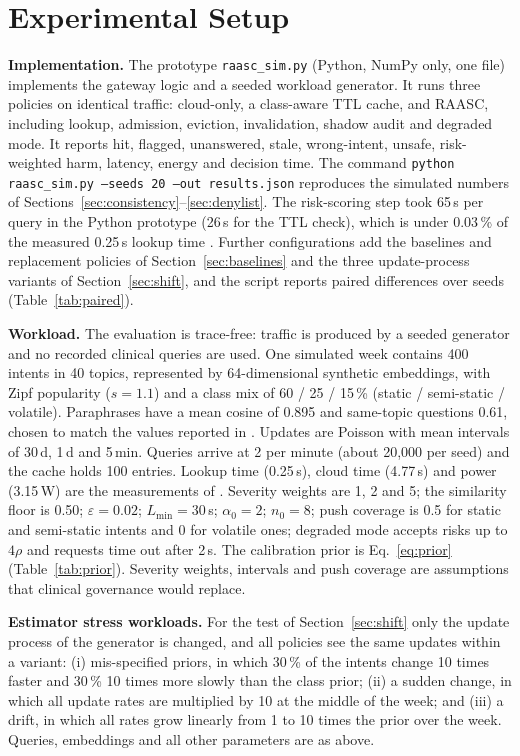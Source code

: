 \documentclass[journal]{IEEEtran}
\newcommand{\pct}{\,\%}
\begin{document}
\section{Experimental Setup}\label{sec:setup}
\textbf{Implementation.} The prototype \texttt{raasc\_sim.py} (Python, NumPy only, one file) implements the gateway logic and a seeded workload generator. It runs three policies on identical traffic: cloud-only, a class-aware TTL cache, and RAASC, including lookup, admission, eviction, invalidation, shadow audit and degraded mode. It reports hit, flagged, unanswered, stale, wrong-intent, unsafe, risk-weighted harm, latency, energy and decision time. The command \texttt{python raasc\_sim.py --seeds 20 --out results.json} reproduces the simulated numbers of Sections~\ref{sec:consistency}--\ref{sec:denylist}. The risk-scoring step took 65\,\textmu s per query in the Python prototype (26\,\textmu s for the TTL check), which is under 0.03\pct{} of the measured 0.25\,s lookup time \cite{montoya2025}. Further configurations add the baselines and replacement policies of Section~\ref{sec:baselines} and the three update-process variants of Section~\ref{sec:shift}, and the script reports paired differences over seeds (Table~\ref{tab:paired}).

\textbf{Workload.} The evaluation is trace-free: traffic is produced by a seeded generator and no recorded clinical queries are used. One simulated week contains 400 intents in 40 topics, represented by 64-dimensional synthetic embeddings, with Zipf popularity ($s=1.1$) and a class mix of 60 / 25 / 15\pct{} (static / semi-static / volatile). Paraphrases have a mean cosine of 0.895 and same-topic questions 0.61, chosen to match the values reported in \cite{montoya2025}. Updates are Poisson with mean intervals of 30\,d, 1\,d and 5\,min. Queries arrive at 2 per minute (about 20,000 per seed) and the cache holds 100 entries. Lookup time (0.25\,s), cloud time (4.77\,s) and power (3.15\,W) are the measurements of \cite{montoya2025}. Severity weights are 1, 2 and 5; the similarity floor is 0.50; $\varepsilon=0.02$; $L_{\min}=30\,$s; $\alpha_0=2$; $n_0=8$; push coverage is 0.5 for static and semi-static intents and 0 for volatile ones; degraded mode accepts risks up to $4\rho$ and requests time out after 2\,s. The calibration prior is Eq.~\eqref{eq:prior} (Table~\ref{tab:prior}). Severity weights, intervals and push coverage are assumptions that clinical governance would replace.

\textbf{Estimator stress workloads.} For the test of Section~\ref{sec:shift} only the update process of the generator is changed, and all policies see the same updates within a variant: (i) mis-specified priors, in which 30\pct{} of the intents change 10 times faster and 30\pct{} 10 times more slowly than the class prior; (ii) a sudden change, in which all update rates are multiplied by 10 at the middle of the week; and (iii) a drift, in which all rates grow linearly from 1 to 10 times the prior over the week. Queries, embeddings and all other parameters are as above.
\end{document}
